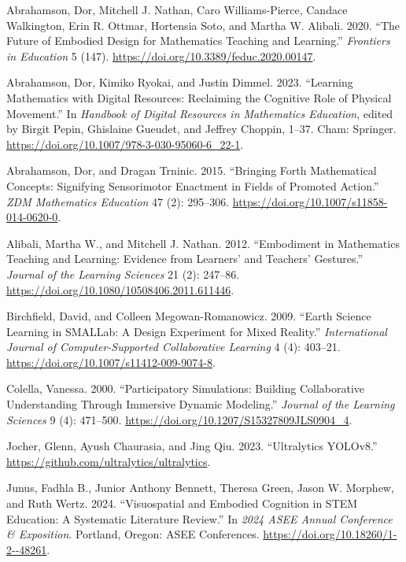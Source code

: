 \label{refs}
\begin{CSLReferences}{1}{0}
Abrahamson, Dor, Mitchell J. Nathan, Caro Williams-Pierce, Candace
Walkington, Erin R. Ottmar, Hortensia Soto, and Martha W. Alibali. 2020.
{``The Future of Embodied Design for Mathematics Teaching and
Learning.''} \emph{Frontiers in Education} 5 (147).
\url{https://doi.org/10.3389/feduc.2020.00147}.

Abrahamson, Dor, Kimiko Ryokai, and Justin Dimmel. 2023. {``Learning
Mathematics with Digital Resources: Reclaiming the Cognitive Role of
Physical Movement.''} In \emph{Handbook of Digital Resources in
Mathematics Education}, edited by Birgit Pepin, Ghislaine Gueudet, and
Jeffrey Choppin, 1--37. Cham: Springer.
\url{https://doi.org/10.1007/978-3-030-95060-6_22-1}.

Abrahamson, Dor, and Dragan Trninic. 2015. {``Bringing Forth
Mathematical Concepts: Signifying Sensorimotor Enactment in Fields of
Promoted Action.''} \emph{ZDM Mathematics Education} 47 (2): 295--306.
\url{https://doi.org/10.1007/s11858-014-0620-0}.

Alibali, Martha W., and Mitchell J. Nathan. 2012. {``Embodiment in
Mathematics Teaching and Learning: Evidence from Learners' and Teachers'
Gestures.''} \emph{Journal of the Learning Sciences} 21 (2): 247--86.
\url{https://doi.org/10.1080/10508406.2011.611446}.

Birchfield, David, and Colleen Megowan-Romanowicz. 2009. {``Earth
Science Learning in SMALLab: A Design Experiment for Mixed Reality.''}
\emph{International Journal of Computer-Supported Collaborative
Learning} 4 (4): 403--21.
\url{https://doi.org/10.1007/s11412-009-9074-8}.

Colella, Vanessa. 2000. {``Participatory Simulations: Building
Collaborative Understanding Through Immersive Dynamic Modeling.''}
\emph{Journal of the Learning Sciences} 9 (4): 471--500.
\url{https://doi.org/10.1207/S15327809JLS0904_4}.

Jocher, Glenn, Ayush Chaurasia, and Jing Qiu. 2023. {``Ultralytics
YOLOv8.''} \url{https://github.com/ultralytics/ultralytics}.

Junus, Fadhla B., Junior Anthony Bennett, Theresa Green, Jason W.
Morphew, and Ruth Wertz. 2024. {``Visuospatial and Embodied Cognition in
STEM Education: A Systematic Literature Review.''} In \emph{2024 ASEE
Annual Conference \& Exposition}. Portland, Oregon: ASEE Conferences.
\url{https://doi.org/10.18260/1-2--48261}.


\end{CSLReferences}
